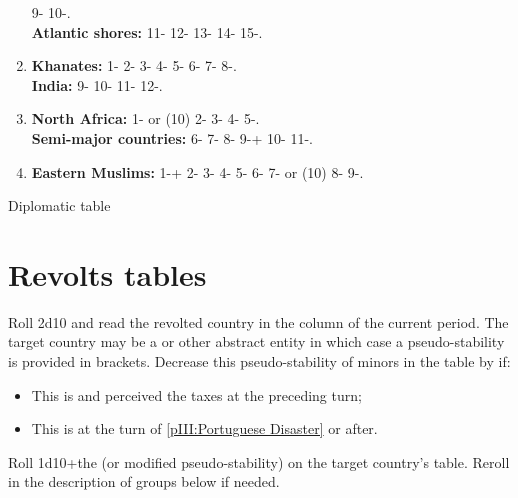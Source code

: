 \begin{tablehere}
\begin{enumerate}
    9- %
    10-.\\ %
    {\bf Atlantic shores:} %
    11- %
    12- %
    13- %
    14- %
    15-. %
  \item {\bf Khanates:} %
    1- %
    2- %
    3- %
    4- %
    5- %
    6- %
    7- %
    8-.\\ %
    {\bf India:} %
    9- %
    10- %
    11- %
    12-. %
  \item {\bf North Africa:} %
    1- or (10) %
    2- %
    3- %
    4-%
    5-.\\ %
    {\bf Semi-major countries:} %
    6- %
    7- %
    8- %
    9-+ %
    10- %
    11-. %
  \item {\bf Eastern Muslims:} %
    1-+ %
    2- %
    3- %
    4- %
    5- %
    6- %
    7- or (10) %
    8- %
    9-. %
  \end{enumerate}
  \caption{Diplomatic table}\label{table:diplomatic event}
\end{tablehere}

\clearpage

\section{Revolts tables}


\aparag Roll 2d10 and read the revolted country in the column of the current
period. The target country may be a \MIN or other abstract entity in which
case a pseudo-stability is provided in brackets.
\bparag Decrease this pseudo-stability of minors in the table by 
if:
\begin{itemize}
\item This is \HOLhol and \SPA perceived the taxes at the preceding turn;
\item This is \PORpor at the turn of \ref{pIII:Portuguese Disaster} or after.
\end{itemize}
\aparag Roll 1d10+the \STAB (or modified pseudo-stability) on the target
country's table. Reroll in the description of groups below if needed.

